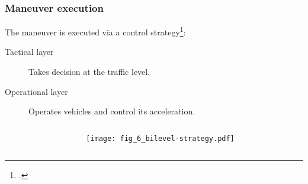 
\begin{frame}
    \frametitle{Maneuver execution}
    The maneuver is executed via a  control strategy\footcite{Duret2018a:JMT}:
    \begin{description}
      \item[Tactical layer]  Takes decision at the traffic level.  
      \item[Operational layer] Operates vehicles and control its acceleration. 
    \end{description}
    \vspace{-1cm}
    \begin{columns}
      \begin{column}{0.5\textwidth}
      \end{column}
      \begin{column}{0.5\textwidth}
        \begin{figure}
          \texttt{[image: fig\_6\_bilevel-strategy.pdf]}\hspace*{2cm} 
        \end{figure}
      \end{column}
    \end{columns}
\end{frame}